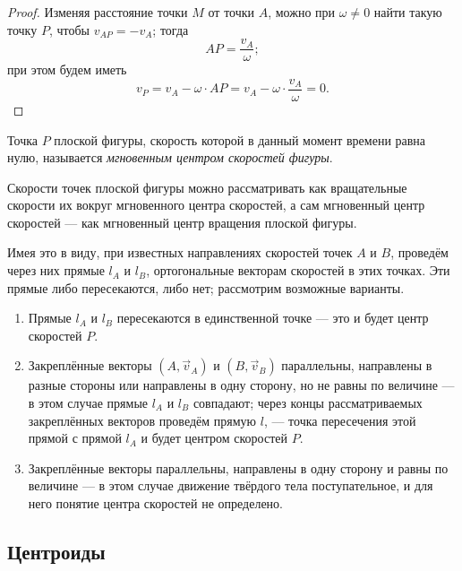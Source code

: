 \begin{proof}
  Изменяя расстояние точки $M$ от точки $A$, можно при $\omega \neq 0$ найти
  такую точку $P$, чтобы $v_{AP} = -v_A$; тогда
  \begin{equation*}
    AP = \frac{v_A}{\omega};
  \end{equation*}
  при этом будем иметь
  \begin{equation*}
    v_P = v_A - \omega \cdot AP = v_A - \omega \cdot \frac{v_A}{\omega} = 0.
  \end{equation*}
\end{proof}

\begin{definition}
  Точка $P$ плоской фигуры, скорость которой в данный момент времени равна нулю,
  называется \textit{мгновенным центром скоростей фигуры}.
\end{definition}

Скорости точек плоской фигуры можно рассматривать как вращательные скорости их
вокруг мгновенного центра скоростей, а сам мгновенный центр скоростей --- как
мгновенный центр вращения плоской фигуры.

Имея это в виду, при известных направлениях скоростей точек $A$ и $B$, проведём
через них прямые $l_A$ и $l_B$, ортогональные векторам скоростей в этих точках.
Эти прямые либо пересекаются, либо нет; рассмотрим возможные варианты.
\begin{enumerate}
  \item Прямые $l_A$ и $l_B$ пересекаются в единственной точке --- это и будет
    центр скоростей $P$.

  \item Закреплённые векторы $(A, \vec{v}_A)$ и $(B, \vec{v}_B)$ параллельны,
    направлены в разные стороны или направлены в одну сторону, но не равны по
    величине --- в этом случае прямые $l_A$ и $l_B$ совпадают; через концы
    рассматриваемых закреплённых векторов проведём прямую $l$, --- точка
    пересечения этой прямой с прямой $l_A$ и будет центром скоростей $P$.

  \item Закреплённые векторы параллельны, направлены в одну сторону и равны по
    величине --- в этом случае движение твёрдого тела поступательное, и для него
    понятие центра скоростей не определено.
\end{enumerate}

\subsection{Центроиды}

